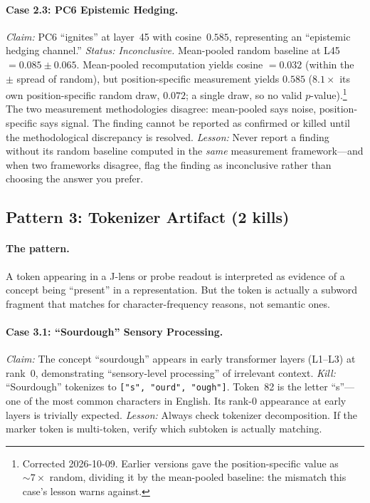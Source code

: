 \documentclass[11pt,a4paper]{article}
\begin{document}
\paragraph{Case 2.3: PC6 Epistemic Hedging.}
\emph{Claim:} PC6 ``ignites'' at layer~45 with cosine~$0.585$,
representing an ``epistemic hedging channel.''
\emph{Status: Inconclusive.} Mean-pooled random baseline at L45
$= 0.085 \pm 0.065$. Mean-pooled recomputation yields cosine $= 0.032$
(within the $\pm$ spread of random), but position-specific measurement yields $0.585$
($8.1\times$ its own position-specific random draw, $0.072$; a single
draw, so no valid $p$-value).\footnote{Corrected 2026-10-09. Earlier
versions gave the position-specific value as ${\sim}7\times$ random,
dividing it by the mean-pooled baseline: the mismatch this case's lesson
warns against.} The two measurement methodologies disagree:
mean-pooled says noise, position-specific says signal. The finding
cannot be reported as confirmed or killed until the methodological
discrepancy is resolved.
\emph{Lesson:} Never report a finding without its random baseline
computed in the \emph{same} measurement framework---and when two
frameworks disagree, flag the finding as inconclusive rather than
choosing the answer you prefer.

\subsection{Pattern 3: Tokenizer Artifact (2 kills)}

\paragraph{The pattern.} A token appearing in a J-lens or probe readout
is interpreted as evidence of a concept being ``present'' in a
representation. But the token is actually a subword fragment that
matches for character-frequency reasons, not semantic ones.

\paragraph{Case 3.1: ``Sourdough'' Sensory Processing.}
\emph{Claim:} The concept ``sourdough'' appears in early transformer
layers (L1--L3) at rank~0, demonstrating ``sensory-level processing'' of
irrelevant context.
\emph{Kill:} ``Sourdough'' tokenizes to \texttt{["s", "ourd", "ough"]}.
Token~82 is the letter ``s''---one of the most common characters in
English. Its rank-0 appearance at early layers is trivially expected.
\emph{Lesson:} Always check tokenizer decomposition. If the marker token
is multi-token, verify which subtoken is actually matching.
\end{document}
